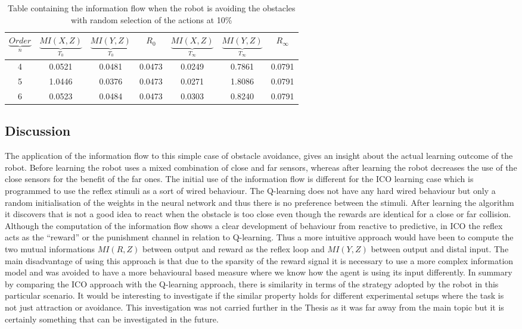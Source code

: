 \begin{table}[htbp]
\addtolength{\tabcolsep}{-2pt}
\centering
\begin{tabular}{| c|| c | c | c | c| c | c |}
\hline
$\underbrace{Order}_ n$& $\underbrace{MI(X,Z)}_{T_0}$& $\underbrace{MI(Y,Z)}_{T_0}$ & $R_0$ & $\underbrace{MI(X,Z)}_{T_\infty}$& $\underbrace{MI(Y,Z)}_{T_\infty}$ & $R_\infty$ \\
\hline
4 & 0.0521 & 0.0481 & 0.0473 & 0.0249 & 0.7861 & 0.0791 \\
\hline
5 & 1.0446 & 0.0376 & 0.0473 & 0.0271 & 1.8086 & 0.0791 \\
\hline
6 & 0.0523 & 0.0484 & 0.0473 & 0.0303 & 0.8240 & 0.0791 \\
\hline
\end{tabular}
\caption[Information flow for avoidance robot]{Table containing the information flow when
the robot is avoiding the obstacles with random selection of the actions at 10\%}
\label{tab:Qlearning:infoflowtable-wrandom}
\end{table}

\subsection{Discussion}
The application of the information flow to this simple case of obstacle avoidance,
gives an insight about the actual learning outcome of the robot.
Before learning the robot uses a mixed combination of close and far sensors,
whereas after learning the robot decreases the use of the close sensors
for the benefit of the far ones.
The initial use of the information flow is different for the ICO learning case
which is programmed to use the reflex stimuli as a sort of wired behaviour.
The Q-learning does not have any hard wired behaviour but only a random
initialisation of the weights in the neural network and thus there is no preference
between the stimuli.
After learning the algorithm it discovers that is not a good idea to react
when the obstacle is too close even though the rewards are identical for
a close or far collision.
Although the computation of the information flow shows a clear development of 
behaviour from reactive to predictive, in ICO the reflex acts as the ``reward'' or 
the punishment channel in relation to Q-learning.
Thus a more intuitive approach would have been to compute the two mutual 
informations $MI(R,Z)$ between output and reward as the reflex loop and $MI(Y,Z)$
between output and distal input.
The main disadvantage of using this approach is that due to the sparsity of the 
reward signal it is necessary to use a more complex information model and was avoided
to have a more behavioural based measure where we know how the agent is using
its input differently.
In summary by comparing the ICO approach with the Q-learning approach,
there is similarity in terms of the strategy adopted by the robot in this particular
scenario.
It would be interesting to investigate if the similar property holds for
different experimental setups where the task is not just attraction or avoidance.
This investigation was not carried further in the Thesis as it was far away from the
main topic but it is certainly something that can be investigated in the future.

